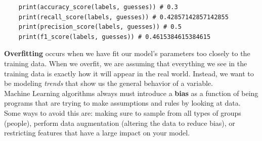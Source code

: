 \documentclass[11pt, a4paper]{article}
\begin{document}
\begin{spacing}{1.1}
\begin{lstlisting}
	print(accuracy_score(labels, guesses)) # 0.3
	print(recall_score(labels, guesses)) # 0.42857142857142855
	print(precision_score(labels, guesses)) # 0.5
	print(f1_score(labels, guesses)) # 0.4615384615384615 \end{lstlisting} \vspace*{2mm}
	\textbf{Overfitting} occurs when we have fit our model’s parameters too closely to the training data. When we overfit, we are assuming that everything we see in the training data is exactly how it will appear in the real world. Instead, we want to be modeling \textit{trends} that show us the general behavior of a variable. \vspace*{1mm} \\
	Machine Learning algorithms always must introduce a \textbf{bias} as a function of being programs that are trying to make assumptions and rules by looking at data. Some ways to avoid this are: making sure to sample from all types of groups (people), perform data augmentation (altering the data to reduce bias), or restricting features that have a large impact on your model. \newpage
	

\end{spacing}
\end{document}
